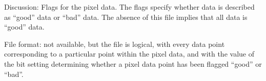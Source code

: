 
Discussion: Flags for the pixel data.  The flags specify whether data is
described as ``good'' data or ``bad'' data.  The absence of this file
implies that all data is ``good'' data.

File format:  not available, but the file is logical, with every data
point corresponding to a particular point within the pixel data, and
with the value of the bit setting determining whether a pixel data point
has been flagged ``good'' or ``bad''.

